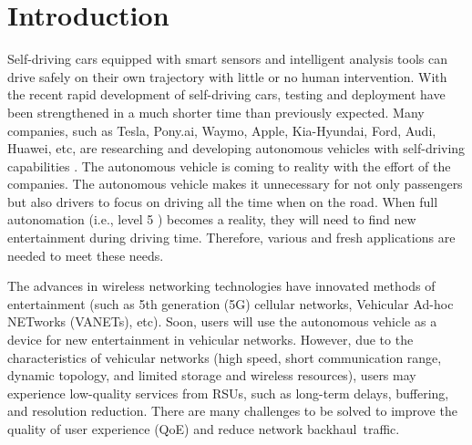 \documentclass[electronics,aricle,accept,pdftex,moreauthors]{Definitions/mdpi}
\begin{document}
\section{Introduction}
Self-driving cars equipped with smart sensors and intelligent analysis tools can drive safely on their own trajectory with little or no human intervention.
With the recent rapid development of self-driving cars, testing and deployment have been strengthened in a much shorter time than previously expected.
Many companies, such as Tesla, Pony.ai, Waymo, Apple, Kia-Hyundai, Ford, Audi, Huawei, etc, are researching and developing autonomous vehicles with self-driving capabilities \cite{zhang2020}.
The autonomous vehicle is coming to reality with the effort of the companies.
The autonomous vehicle makes it unnecessary for not only passengers but also drivers to focus on driving all the time when on the road.
When full autonomation (i.e., level 5 \cite{yuan2018}) becomes a reality, they will need to find new entertainment during driving time.
Therefore, various and fresh applications are needed to meet these needs.

The advances in wireless networking technologies have innovated methods of entertainment (such as 5th generation (5G) cellular networks, Vehicular Ad-hoc NETworks (VANETs), etc).
Soon, users will use the autonomous vehicle as a device for new entertainment in vehicular networks.
However, due to the characteristics of vehicular networks (high speed, short communication range, dynamic topology, and limited storage and wireless resources), users may experience low-quality services from RSUs, such as long-term delays, buffering, and resolution reduction.
There are many challenges to be solved to improve the quality of user experience (QoE) and reduce network backhaul~traffic.
\end{document}
